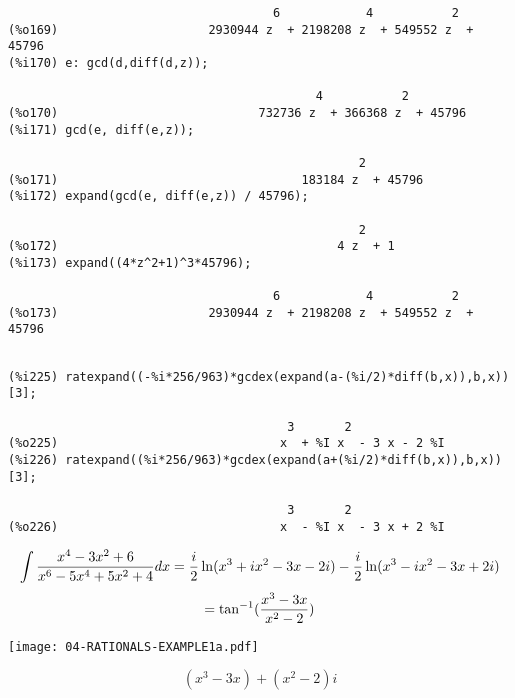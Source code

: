 {\begin{verbatim}
                                     6            4           2
(%o169)                     2930944 z  + 2198208 z  + 549552 z  + 45796
(%i170) e: gcd(d,diff(d,z));

                                           4           2
(%o170)                            732736 z  + 366368 z  + 45796
(%i171) gcd(e, diff(e,z));

                                                 2
(%o171)                                  183184 z  + 45796
(%i172) expand(gcd(e, diff(e,z)) / 45796);

                                                 2
(%o172)                                       4 z  + 1
(%i173) expand((4*z^2+1)^3*45796);

                                     6            4           2
(%o173)                     2930944 z  + 2198208 z  + 549552 z  + 45796


\end{verbatim}}

\vfill\eject

{\small\begin{verbatim}
(%i225) ratexpand((-%i*256/963)*gcdex(expand(a-(%i/2)*diff(b,x)),b,x))[3];

                                       3       2
(%o225)                               x  + %I x  - 3 x - 2 %I
(%i226) ratexpand((%i*256/963)*gcdex(expand(a+(%i/2)*diff(b,x)),b,x))[3];

                                       3       2
(%o226)                               x  - %I x  - 3 x + 2 %I
\end{verbatim}}

$$\int {{x^4-3x^2+6}\over{x^6-5x^4+5x^2+4}} dx =
   {i\over2}\ln(x^3+ix^2-3x-2i) - {i\over2}\ln(x^3-ix^2-3x+2i)$$
$$=\tan^{-1}({{x^3-3x}\over{x^2-2}})$$

\vfill

\begin{center}
\texttt{[image: 04-RATIONALS-EXAMPLE1a.pdf]}
\end{center}
$$(x^3-3x)+(x^2-2)i$$

